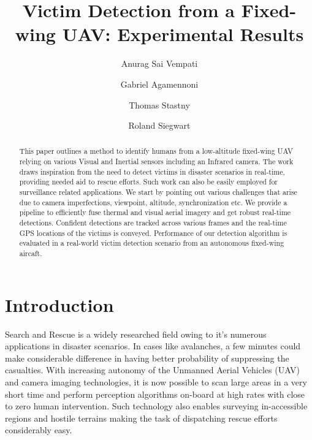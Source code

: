 \documentclass[runningheads]{llncs}
\begin{document}
\pagestyle{headings}

\mainmatter

\title{Victim Detection from a Fixed-wing UAV: Experimental Results}

\author{Anurag Sai Vempati \and Gabriel Agamennoni \and
Thomas Stastny \and Roland Siegwart}





\maketitle

\begin{abstract}
This paper outlines a method to identify humans from a low-altitude fixed-wing UAV relying on various Visual and Inertial sensors including an Infrared camera. The work draws inspiration from the need to detect victims in disaster scenarios in real-time, providing needed aid to rescue efforts. Such work can also be easily employed for surveillance related applications. We start by pointing out various challenges that arise due to camera imperfections, viewpoint, altitude, synchronization etc. We provide a pipeline to efficiently fuse thermal and visual aerial imagery and get robust real-time detections. Confident detections are tracked across various frames and the real-time GPS locations of the victims is conveyed. Performance of our detection algorithm is evaluated in a real-world victim detection scenario from an autonomous fixed-wing aircaft.
\end{abstract}


\section{Introduction}
Search and Rescue is a widely researched field owing to it's numerous applications in disaster scenarios. In cases like avalanches, a few minutes could make considerable difference in having better probability of suppressing the casualties. With increasing autonomy of the Unmanned Aerial Vehicles (UAV) and camera imaging technologies, it is now possible to scan large areas in a very short time and perform perception algorithms on-board at high rates with close to zero human intervention. Such technology also enables surveying in-accessible regions and hostile terrains making the task of dispatching rescue efforts considerably easy.
\end{document}

